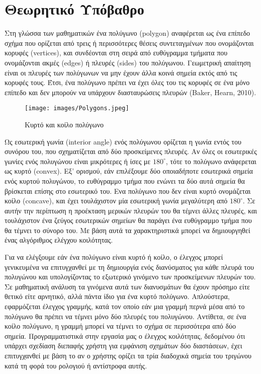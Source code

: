 \chapter{Θεωρητικό Υπόβαθρο}

Στη γλώσσα των μαθηματικών ένα πολύγωνο \textlatin{(polygon)} αναφέρεται ως ένα επίπεδο σχήμα που ορίζεται από τρεις ή περισσότερες θέσεις συντεταγμένων που ονομάζονται κορυφές \textlatin{(vertices)}, και συνδέονται στη σειρά από ευθύγραμμα τμήματα που ονομάζονται ακμές \textlatin{(edges)} ή πλευρές \textlatin{(sides)} του πολύγωνου. Γεωμετρική απαίτηση είναι οι πλευρές των πολύγωνων να μην έχουν άλλα κοινά σημεία εκτός από τις κορυφές τους. Έτσι, ένα πολύγωνο πρέπει να έχει όλες του τις κορυφές σε ένα μόνο επίπεδο και δεν μπορούν να υπάρχουν διασταυρώσεις πλευρών \textlatin{(Baker, Hearn, 2010)}.
\begin{figure}[h]
\centering
\texttt{[image: images/Polygons.jpeg]}
\caption{Κυρτό και κοίλο πολύγωνο}
\end{figure}
\par
Ως εσωτερική γωνία \textlatin{(interior angle)} ενός πολύγωνου ορίζεται η γωνία εντός του συνόρου του, που σχηματίζεται από δύο προσκείμενες πλευρές. Αν όλες οι εσωτερικές γωνίες ενός πολυγώνου είναι μικρότερες ή ίσες με $180^\circ$, τότε το πολύγωνο ανάφερεται ως κυρτό \textlatin{(convex)}. Εξ' ορισμού, εάν επιλέξουμε δύο οποιαδήποτε εσωτερικά σημεία ενός κυρτού πολυγώνου, το ευθύγραμμο τμήμα που ενώνει τα δύο αυτά σημεία θα βρίσκεται επίσης στο εσωτερικό του. Ενα πολύγωνο που δεν είναι κυρτό ονομάζεται κοίλο \textlatin{(concave)}, και έχει τουλάχιστον μία εσωτερική γωνία μεγαλύτερη από $180^\circ$. Σε αυτήν την περίπτωση η προέκταση μερικών πλευρών του θα τέμνει άλλες πλευρές, και τουλάχιστον ένα ζεύγος εσωτερικών σημείων θα παράγει ένα ευθύγραμμο τμήμα που θα τέμνει το σύνορο του. Με βάση αυτά τα χαρακτηριστικά μπορεί να δημιουργηθεί ένας αλγόριθμος ελέγχου κοιλότητας. 
\par

Για να ελέγξουμε εάν ένα πολύγωνο είναι κυρτό ή κοίλο, ο έλεγχος μπορεί γενικευμένα να επιτυγχανθεί με τη δημιουργία ενός διανύσματος για κάθε πλευρά του πολυγώνου και υπολογίζοντας το εξωτερικό γινόμενο των προσκείμενων πλευρών του. Σε μαθηματική ανάλυση τα γινόμενα αυτά των διανυσμάτων θα έχουν πρόσημο είτε θετικό είτε αρνητικό, αλλά πάντα ίδιο για ένα κυρτό πολύγωνο. Απλούστερα, εφαρμόζεται έλεγχος γραμμής, κατά τον οποίο εάν μια γραμμή περνά μέσα από το πολύγωνο θα πρέπει να τέμνει μόνο δύο πλευρές του πολυγώνου. Αντίθετα, σε ένα κοίλο πολύγωνο, η γραμμή μπορεί να τέμνει το σχήμα σε περισσότερα από δύο σημεία. Προγραμματιστικά στην εργασία μας ο έλεγχος κοιλότητας, δεδομένου ότι υπάρχει σχεδίαση διεπαφής χρήστη για εμφάνιση σχημάτων δύο διαστάσεων, έχει επιτυγχανθεί με βάση το αν ο χρήστης ορίζει τα τρία διαδοχικά σημεία του τριγώνου κατά τη φορά του ρολογιού ή αντίστροφα αυτής.

